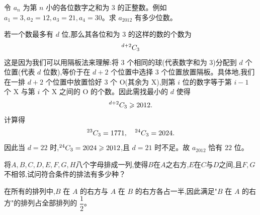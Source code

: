 \begin{questions}
    \question 令 $a_n$ 为第 $n$ 小的各位数字之和为 $3$ 的正整数。例如 $a_1=3, a_2=12, a_3=21, a_4=30$。求 $a_{2012}$ 有多少位数。  
    \begin{solution}
        若一个数最多有 $d$ 位,那么其各位和为 $3$ 的这样的数的个数为
        \[
        {}^{d+2}C_{3}
        \]
        这是因为我们可以用隔板法来理解:将 $3$ 个相同的球(代表数字和为 3)分配到 $d$ 个位置(代表 $d$ 位数),等价于在 $d+2$ 个位置中选择 $3$ 个位置放置隔板。具体地,我们在一排 $d+2$ 个位置中放置恰好 $3$ 个 O(其余为 X),则第 $i$ 位的数字等于第 $i-1$ 个 X 与第 $i$ 个 X 之间的 O 的个数。因此需找最小的 $d$ 使得
        \[
        {}^{d+2}C_{3}\geqslant 2012.
        \]
        计算得
        \[
        {}^{23}C_{3}=1771,\quad {}^{24}C_{3}=2024.
        \]
        因此当 $d=22$ 时,${}^{24}C_{3}=2024\geqslant2012$,且 $d=21$ 时不足。故 $a_{2012}$ 恰有 $22$ 位。
    \end{solution}

    \question 将$A,B,C,D,E,F,G,H$八个字母排成一列,使得$B$在$A$之右方,$E$在$C$与$D$之间,且$F,G$不相邻,试问符合条件的排法有多少种？
    \begin{solution}
        在所有的排列中,$B$ 在 $A$ 的右方与 $A$ 在 $B$ 的右方各占一半,因此满足"$B$ 在 $A$ 的右方"的排列占全部排列的 $\dfrac{1}{2}$。
        

\end{solution}
\end{questions}
